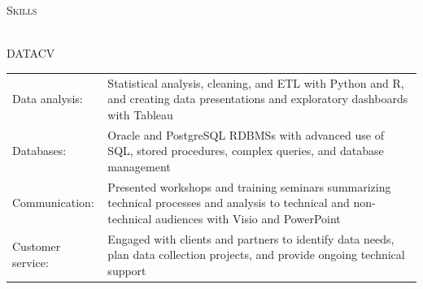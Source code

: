 \documentclass[letterpaper]{article}
\newcommand{\lineunder} {
        \vspace*{-8pt} \\
        \hspace*{-18pt} \hrulefill \\
    }
\newcommand{\header} [1] {
        {\hspace*{-18pt}\vspace*{6pt} \textsc{#1}}
        \vspace*{-6pt} \lineunder
        \vspace{1mm}
    }
\begin{document}
\header{Skills}
    \begin{taggedblock}{DATACV}
        \begin{tabular}[t]{ l L{5.17in} }
            Data analysis: &
                Statistical analysis, cleaning, and ETL with Python and R, 
                and creating data presentations and exploratory dashboards with
                Tableau
                \\
            Databases: & 
                Oracle and PostgreSQL RDBMSs with advanced use of SQL, stored
                procedures, complex queries, and database management
                \\
            Communication: &
                Presented workshops and training seminars summarizing technical
                processes and analysis to technical and non-technical audiences
                with Visio and PowerPoint
                \\
            Customer service: &
                Engaged with clients and partners to identify data needs, plan data
                collection projects, and provide ongoing technical support
                \\
        \end{tabular}
    \end{taggedblock}
\end{document}
